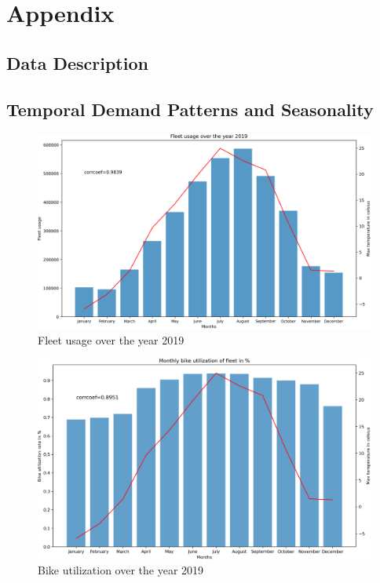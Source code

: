 \clearpage
\section{Appendix}
\label{app:A}

\subsection{Data Description}
\label{app:A1}




\subsection{Temporal Demand Patterns and Seasonality}
\label{app:A2}

\begin{figure}[H]
    \centering
    \includegraphics[width=1\linewidth]{./Figures/fleetUsageYear.png}
    \caption{Fleet usage over the year 2019}
    \label{fleetUsageYear}
\end{figure}

\begin{figure}[H]
    \centering
    \includegraphics[width=1\linewidth]{./Figures/fleetUtilizationYear.png}
    \caption{Bike utilization over the year 2019}
    \label{fleetUtilizationYear}
\end{figure}

